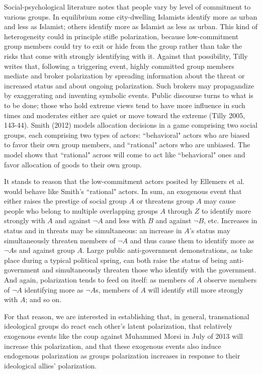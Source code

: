 \documentclass[12pt]{article}
\begin{document}
Social-psychological literature notes that people vary by level of commitment to various groups.   In equilibrium some city-dwelling Islamists identify more as urban and less as Islamist; others identify more as Islamist as less as urban.  This kind of heterogeneity could in principle stifle polarization, because low-commitment group members could try to exit or hide from the group rather than take the risks that come with strongly identifying with it.  Against that possibility, Tilly writes that, following a triggering event, highly committed group members mediate and broker polarization by spreading information about the threat or increased status and about ongoing polarization.   Such brokers may propagandize by exaggerating and inventing symbolic events.  Public discourse turns to what is to be done; those who hold extreme views tend to have more influence in such times and moderates either are quiet or move toward the extreme (Tilly 2005, 143-44).   Smith (2012) models allocation decisions in a game comprising two social groups, each comprising two types of actors:  ``behavioral" actors who are biased to favor their own group members, and ``rational" actors who are unbiased.  The model shows that ``rational" across will come to act like ``behavioral" ones and favor allocation of goods to their own group.  

It stands to reason that the low-commitment actors posited by Ellemers et al. would behave like Smith's ``rational" actors.
In sum, an exogenous event that either raises the prestige of social group $A$ or threatens group $A$ may cause people who belong to multiple overlapping groups $A$ through $Z$ to identify more strongly with $A$ and against $\neg A$ and less with $B$ and against $\neg B$, etc.  Increases in status and in threats may be simultaneous:  an increase in $A$'s status may simultaneously threaten members of $\neg A$ and thus cause them to identify more as $\neg A$s and against group $A$.  Large public anti-government demonstrations, as take place during a typical political spring, can both raise the status of being anti-government and simultaneously threaten those who identify with the government.  And again, polarization tends to feed on itself:  as members of $A$ observe members of $\neg A$ identifying more as $\neg A$s, members of $A$ will identify still more strongly with $A$; and so on. 

For that reason, we are interested in establishing that, in general, transnational ideological groups do react each other's latent polarization, that relatively exogenous events like the coup against Muhammed Morsi in July of 2013 will increase this polarization, and that these exogenous events also induce endogenous polarization as groups polarization increases in response to their ideological allies' polarization.
\end{document}
